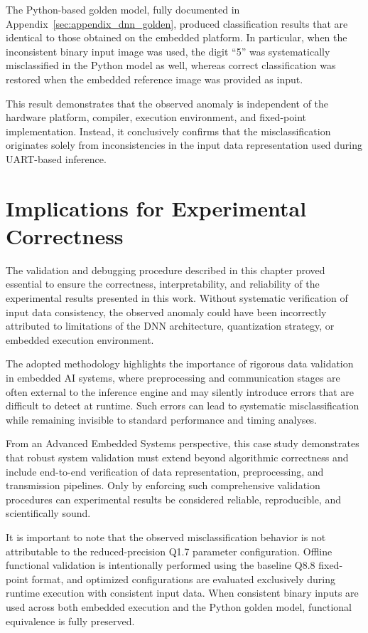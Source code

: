 The Python-based golden model, fully documented in
Appendix~\ref{sec:appendix_dnn_golden}, produced classification results that are
identical to those obtained on the embedded platform.
In particular, when the inconsistent binary input image was used, the digit ``5''
was systematically misclassified in the Python model as well, whereas correct
classification was restored when the embedded reference image was provided as
input.

This result demonstrates that the observed anomaly is independent of the hardware
platform, compiler, execution environment, and fixed-point implementation.
Instead, it conclusively confirms that the misclassification originates solely
from inconsistencies in the input data representation used during UART-based
inference.

\section{Implications for Experimental Correctness}

The validation and debugging procedure described in this chapter proved essential
to ensure the correctness, interpretability, and reliability of the experimental
results presented in this work.
Without systematic verification of input data consistency, the observed anomaly
could have been incorrectly attributed to limitations of the DNN architecture,
quantization strategy, or embedded execution environment.

The adopted methodology highlights the importance of rigorous data validation in
embedded AI systems, where preprocessing and communication stages are often
external to the inference engine and may silently introduce errors that are
difficult to detect at runtime.
Such errors can lead to systematic misclassification while remaining invisible to
standard performance and timing analyses.

From an Advanced Embedded Systems perspective, this case study demonstrates that
robust system validation must extend beyond algorithmic correctness and include
end-to-end verification of data representation, preprocessing, and transmission
pipelines.
Only by enforcing such comprehensive validation procedures can experimental
results be considered reliable, reproducible, and scientifically sound.

It is important to note that the observed misclassification behavior is not
attributable to the reduced-precision Q1.7 parameter configuration.
Offline functional validation is intentionally performed using the baseline
Q8.8 fixed-point format, and optimized configurations are evaluated exclusively
during runtime execution with consistent input data.
When consistent binary inputs are used across both embedded execution and the
Python golden model, functional equivalence is fully preserved.



